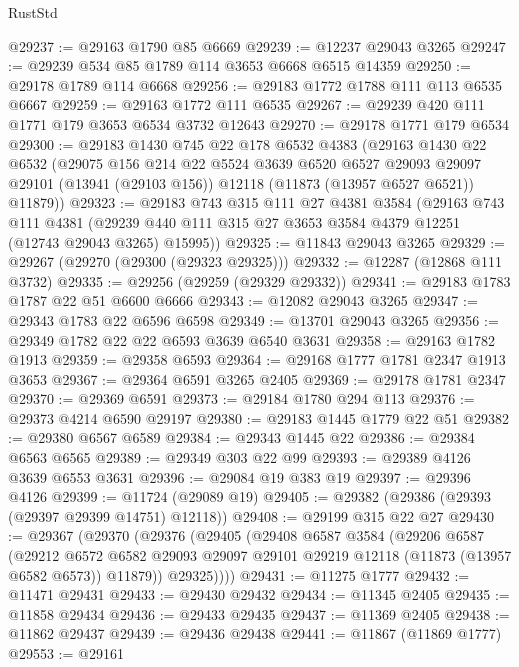 \begin{lexlean}{RustStd}
\begin{coremodule}
@29237 := @29163 @1790 @85 @6669
@29239 := @12237 @29043 @3265
@29247 := @29239 @534 @85 @1789 @114 @3653 @6668 @6515 @14359
@29250 := @29178 @1789 @114 @6668
@29256 := @29183 @1772 @1788 @111 @113 @6535 @6667
@29259 := @29163 @1772 @111 @6535
@29267 := @29239 @420 @111 @1771 @179 @3653 @6534 @3732 @12643
@29270 := @29178 @1771 @179 @6534
@29300 := @29183
    @1430
    @745
    @22
    @178
    @6532
    @4383
    (@29163
      @1430
      @22
      @6532
      (@29075
        @156
        @214
        @22
        @5524
        @3639
        @6520
        @6527
        @29093
        @29097
        @29101
        (@13941 (@29103 @156))
        @12118
        (@11873 (@13957 @6527 @6521))
        @11879))
@29323 := @29183
    @743
    @315
    @111
    @27
    @4381
    @3584
    (@29163
      @743
      @111
      @4381
      (@29239 @440 @111 @315 @27 @3653 @3584 @4379 @12251 (@12743 @29043 @3265) @15995))
@29325 := @11843 @29043 @3265
@29329 := @29267 (@29270 (@29300 (@29323 @29325)))
@29332 := @12287 (@12868 @111 @3732)
@29335 := @29256 (@29259 (@29329 @29332))
@29341 := @29183 @1783 @1787 @22 @51 @6600 @6666
@29343 := @12082 @29043 @3265
@29347 := @29343 @1783 @22 @6596 @6598
@29349 := @13701 @29043 @3265
@29356 := @29349 @1782 @22 @22 @6593 @3639 @6540 @3631
@29358 := @29163 @1782 @1913
@29359 := @29358 @6593
@29364 := @29168 @1777 @1781 @2347 @1913 @3653
@29367 := @29364 @6591 @3265 @2405
@29369 := @29178 @1781 @2347
@29370 := @29369 @6591
@29373 := @29184 @1780 @294 @113
@29376 := @29373 @4214 @6590 @29197
@29380 := @29183 @1445 @1779 @22 @51
@29382 := @29380 @6567 @6589
@29384 := @29343 @1445 @22
@29386 := @29384 @6563 @6565
@29389 := @29349 @303 @22 @99
@29393 := @29389 @4126 @3639 @6553 @3631
@29396 := @29084 @19 @383 @19
@29397 := @29396 @4126
@29399 := @11724 (@29089 @19)
@29405 := @29382 (@29386 (@29393 (@29397 @29399 @14751) @12118))
@29408 := @29199 @315 @22 @27
@29430 := @29367
    (@29370
      (@29376
        (@29405
          (@29408
            @6587
            @3584
            (@29206
              @6587
              (@29212
                @6572
                @6582
                @29093
                @29097
                @29101
                @29219
                @12118
                (@11873 (@13957 @6582 @6573))
                @11879))
            @29325))))
@29431 := @11275 @1777
@29432 := @11471 @29431
@29433 := @29430 @29432
@29434 := @11345 @2405
@29435 := @11858 @29434
@29436 := @29433 @29435
@29437 := @11369 @2405
@29438 := @11862 @29437
@29439 := @29436 @29438
@29441 := @11867 (@11869 @1777)
@29553 := @29161

\end{coremodule}
\end{lexlean}
